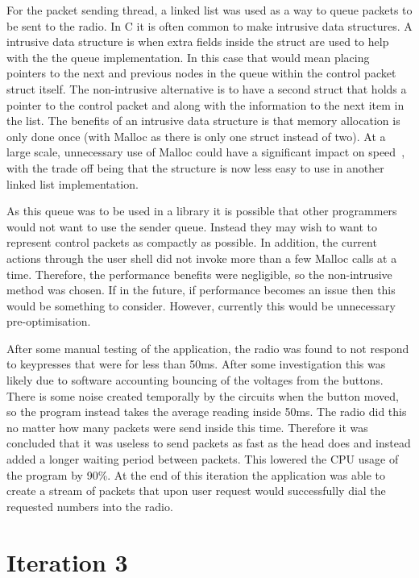 For the packet sending thread, a linked list was used as a way to queue packets to be sent to the radio. In C it is often common to make intrusive data structures. A intrusive data structure is when extra fields inside the struct are used to help with the the queue implementation. In this case that would mean placing pointers to the next and previous nodes in the queue within the control packet struct itself. The non-intrusive alternative is to have a second struct that holds a pointer to the control packet and along with the information to the next item in the list. The benefits of an intrusive data structure is that memory allocation is only done once (with Malloc as there is only one struct instead of two). At a large scale, unnecessary use of Malloc could have a significant impact on speed~\cite{curl_mallocs}, with the trade off being that the structure is now less easy to use in another linked list implementation. 

As this queue was to be used in a library it is possible that other programmers would not want to use the sender queue. Instead they may wish to want to represent control packets as compactly as possible. In addition, the current actions through the user shell did not invoke more than a few Malloc calls at a time. Therefore, the performance benefits were negligible, so the non-intrusive method was chosen. If in the future, if performance becomes an issue then this would be something to consider. However, currently this would be unnecessary pre-optimisation.

After some manual testing of the application, the radio was found to not respond to keypresses that were for less than 50ms. After some investigation this was likely due to software accounting bouncing of the voltages from the buttons. There is some noise created temporally by the circuits when the button moved, so the program instead takes the average reading inside 50ms. The radio did this no matter how many packets were send inside this time. Therefore it was concluded that it was useless to send packets as fast as the head does and instead added a longer waiting period between packets. This lowered the CPU usage of the program by 90\%. At the end of this iteration the application was able to create a stream of packets that upon user request would successfully dial the requested numbers into the radio. 

\section{Iteration 3}
